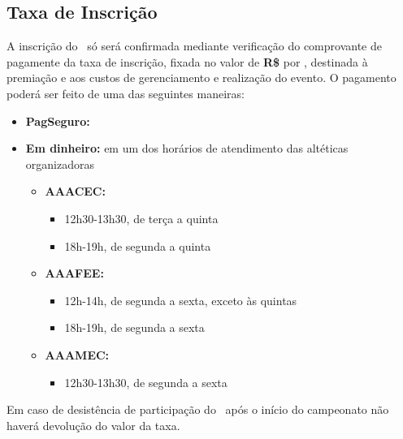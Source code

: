 \subsection{Taxa de Inscrição}

A inscrição do \BasicUnit\ só será confirmada mediante verificação do comprovante de pagamente da taxa de inscrição, fixada no valor de \textbf{R\$ \TaxValue} por \BasicUnit, destinada à premiação e aos custos de gerenciamento e realização do evento. O pagamento poderá ser feito de uma das seguintes maneiras:

\begin{itemize}
	\item \textbf{PagSeguro:} \urls{\PaymentURL}
	\item \textbf{Em dinheiro:} em um dos horários de atendimento das altéticas organizadoras
	\begin{itemize}
		\item \textbf{AAACEC:}
		\begin{itemize}
			\item 12h30-13h30, de terça a quinta
			\item 18h-19h, de segunda a quinta
		\end{itemize}

		\item \textbf{AAAFEE:}
		\begin{itemize}
			\item 12h-14h, de segunda a sexta, exceto às quintas
			\item 18h-19h, de segunda a sexta
		\end{itemize}

		\item \textbf{AAAMEC:}
		\begin{itemize}
			\item 12h30-13h30, de segunda a sexta
		\end{itemize}
	\end{itemize}
\end{itemize}

Em caso de desistência de participação do \BasicUnit\ após o início do campeonato não haverá devolução do valor da taxa.